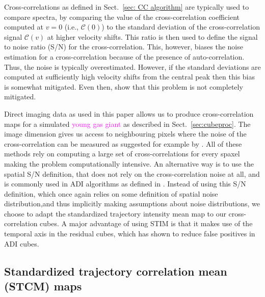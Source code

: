 \documentclass[referee]{aa} %
\newcommand{\newchange}[1]{\textcolor{magenta}{#1}}
\begin{document}
Cross-correlations as defined in Sect.~\ref{sec: CC algorithm} are typically used to compare spectra, by comparing the value of the cross-correlation coefficient computed at $v=0$ (i.e., $\mathcal{C}(0)$) to the standard deviation of the cross-correlation signal $\mathcal{C}(v)$ at higher velocity shifts.
This ratio is then used to define the signal to noise ratio (S/N) for the cross-correlation.
This, however, biases the noise estimation for a cross-correlation because of the presence of auto-correlation.
Thus, the noise is typically overestimated. %
However, if the standard deviations are computed at sufficiently high velocity shifts from the central peak \citep[e.g., for $|v|\ge 250$ km/s in][]{2018AHoeijmakersMM} then this bias is somewhat mitigated.
Even then, \citet{ruffio2019radial} show that this problem is not completely mitigated. 

Direct imaging data as used in this paper allows us to produce cross-correlation maps for a simulated \newchange{young gas giant} as described in Sect.~\ref{sec:cubeproc}.
The image dimension gives us access to neighbouring pixels where the noise of the cross-correlation can be measured as suggested for example by \citet{2022Patapis}.
All of these methods rely on computing a large set of cross-correlations for every spaxel making the problem computationally intensive.
An alternative way is to use the spatial S/N definition, that does not rely on the cross-correlation noise at all, and is commonly used in ADI algorithms as defined in \citet{2014MawetSNR}.
Instead of using this S/N definition, which once again relies on some definition of spatial noise distribution,and thus implicitly making assumptions about noise distributions,  we choose to adapt the standardized trajectory intensity mean \citep[STIM,][]{2019Pairet} map to our cross-correlation cubes. 
A major advantage of using STIM is that it makes use of the temporal axis in the residual cubes, which has shown to reduce false positives in ADI cubes.
\subsection{Standardized trajectory correlation mean (STCM) maps}
\end{document}
